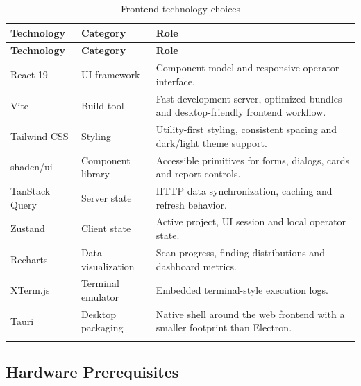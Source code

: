 \documentclass[12pt,a4paper]{report}
\begin{document}
\renewcommand{\arraystretch}{1.35}
\begin{longtable}{|p{}|p{}|p{}|}
\hline
\textbf{Technology} & \textbf{Category} & \textbf{Role} \\
\hline
\endfirsthead
\hline
\textbf{Technology} & \textbf{Category} & \textbf{Role} \\
\hline
\endhead
React 19 & UI framework & Component model and responsive operator
interface. \\
\hline
Vite & Build tool & Fast development server, optimized bundles and
desktop-friendly frontend workflow. \\
\hline
Tailwind CSS & Styling & Utility-first styling, consistent spacing and
dark/light theme support. \\
\hline
shadcn/ui & Component library & Accessible primitives for forms, dialogs,
cards and report controls. \\
\hline
TanStack Query & Server state & HTTP data synchronization, caching and
refresh behavior. \\
\hline
Zustand & Client state & Active project, UI session and local operator
state. \\
\hline
Recharts & Data visualization & Scan progress, finding distributions and
dashboard metrics. \\
\hline

XTerm.js & Terminal emulator & Embedded terminal-style execution logs. \\
\hline
Tauri & Desktop packaging & Native shell around the web frontend with a
smaller footprint than Electron. \\
\hline
\caption{Frontend technology choices}
\label{tab:frontend_stack}
\end{longtable}

\subsection{Hardware Prerequisites}
\end{document}

